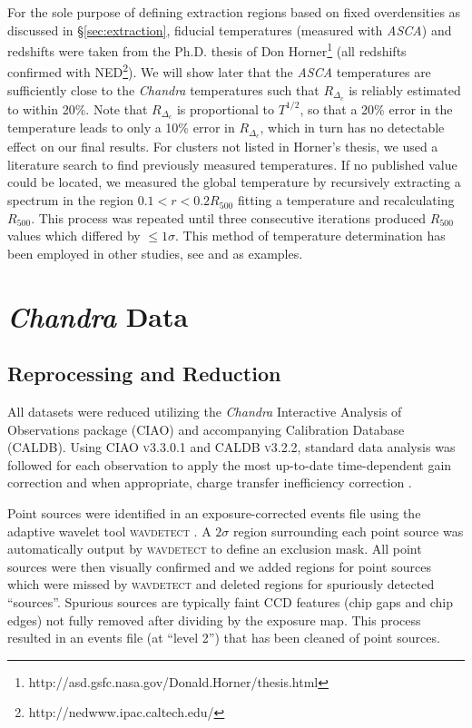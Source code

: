 \documentclass[12pt,preprint]{aastex}
\begin{document}
For the sole purpose of defining extraction regions based on fixed
overdensities as discussed in \S\ref{sec:extraction}, fiducial
temperatures (measured with {\it ASCA}) and redshifts were taken from
the Ph.D. thesis of Don
Horner\footnote{http://asd.gsfc.nasa.gov/Donald.Horner/thesis.html}
(all redshifts confirmed with
NED\footnote{http://nedwww.ipac.caltech.edu/}). We will show later
that the {\it ASCA} temperatures are sufficiently close to the {\it
Chandra} temperatures such that $R_{\Delta_c}$ is reliably estimated
to within 20\%. Note that $R_{\Delta_c}$ is proportional to $T^{1/2}$,
so that a 20\% error in the temperature leads to only a 10\% error in
$R_{\Delta_c}$, which in turn has no detectable effect on our final
results. For clusters not listed in Horner's thesis, we used a
literature search to find previously measured temperatures. If no
published value could be located, we measured the global temperature
by recursively extracting a spectrum in the region $0.1<r<0.2
R_{500}$ fitting a temperature and recalculating $R_{500}$. This
process was repeated until three consecutive iterations produced
$R_{500}$ values which differed by $\leq 1\sigma$. This method of
temperature determination has been employed in other studies, see
\cite{2006MNRAS.tmp.1068S} and \cite{2006ApJS..162..304H} as
examples.

\section{{\it Chandra} Data}\label{sec:data}

\subsection{Reprocessing and Reduction}\label{sec:reprocessing}

All datasets were reduced utilizing the {\it Chandra} Interactive
Analysis of Observations package ({\textsc{CIAO}}) and accompanying
Calibration Database ({\textsc{CALDB}}). Using {\textsc{CIAO
v3.3.0.1}} and {\textsc{CALDB v3.2.2}}, standard data analysis was
followed for each observation to apply the most up-to-date
time-dependent gain correction and when appropriate, charge transfer
inefficiency correction \citep{2000ApJ...534L.139T}.

Point sources were identified in an exposure-corrected events file
using the adaptive wavelet tool {\textsc{wavdetect}}
\citep{2002ApJS..138..185F}. A $2\sigma$ region surrounding each point
source was automatically output by {\textsc{wavdetect}} to define an
exclusion mask.  All point sources were then visually confirmed and we
added regions for point sources which were missed by
{\textsc{wavdetect}} and deleted regions for spuriously detected
``sources''. Spurious sources are typically faint CCD features (chip
gaps and chip edges) not fully removed after dividing by the exposure
map. This process resulted in an events file (at ``level 2'') that has
been cleaned of point sources.
\end{document}
